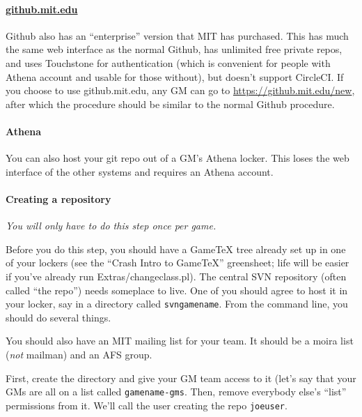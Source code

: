 \documentclass[green]{testgame}
\begin{document}
\paragraph*{\href{https://github.mit.edu}{github.mit.edu}} Github also has an ``enterprise'' version that MIT has purchased. This has much the same web interface as the normal Github, has unlimited free private repos, and uses Touchstone for authentication (which is convenient for people with Athena account and usable for those without), but doesn't support CircleCI. If you choose to use github.mit.edu, any GM can go to \url{https://github.mit.edu/new}, after which the procedure should be similar to the normal Github procedure.

\paragraph*{Athena} You can also host your git repo out of a GM's Athena locker. This loses the web interface of the other systems and requires an Athena account.


\paragraph*{Creating a repository}

{\em You will only have to do this step once per game.}

Before you do this step, you should have a GameTeX tree already set up
in one of your lockers (see the ``Crash Intro to GameTeX'' greensheet;
life will be easier if you've already run Extras/changeclass.pl). The
central SVN repository (often called ``the repo'') needs someplace to
live. One of you should agree to host it in your locker, say in a
directory called {\tt svngamename}. From the command line, you should
do several things.

You should also have an MIT mailing list for your team.  It should
be a moira list ({\em not} mailman) and an AFS group.

First, create the directory and give your GM team access to it (let's
say that your GMs are all on a list called {\tt gamename-gms}. Then,
remove everybody else's ``list'' permissions from it. We'll call the
user creating the repo {\tt joeuser}.

\end{document}
